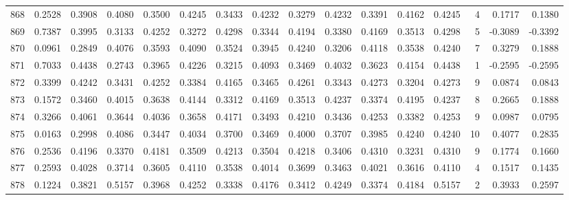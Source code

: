 \begin{tabular}{lrrrrrrrrrrrrrrr}
868 &      0.2528 &  0.3908 &  0.4080 &  0.3500 &  0.4245 &  0.3433 &  0.4232 &  0.3279 &  0.4232 &  0.3391 &   0.4162 &     0.4245 &      4 &                    0.1717 &                     0.1380 \\
869 &      0.7387 &  0.3995 &  0.3133 &  0.4252 &  0.3272 &  0.4298 &  0.3344 &  0.4194 &  0.3380 &  0.4169 &   0.3513 &     0.4298 &      5 &                   -0.3089 &                    -0.3392 \\
870 &      0.0961 &  0.2849 &  0.4076 &  0.3593 &  0.4090 &  0.3524 &  0.3945 &  0.4240 &  0.3206 &  0.4118 &   0.3538 &     0.4240 &      7 &                    0.3279 &                     0.1888 \\
871 &      0.7033 &  0.4438 &  0.2743 &  0.3965 &  0.4226 &  0.3215 &  0.4093 &  0.3469 &  0.4032 &  0.3623 &   0.4154 &     0.4438 &      1 &                   -0.2595 &                    -0.2595 \\
872 &      0.3399 &  0.4242 &  0.3431 &  0.4252 &  0.3384 &  0.4165 &  0.3465 &  0.4261 &  0.3343 &  0.4273 &   0.3204 &     0.4273 &      9 &                    0.0874 &                     0.0843 \\
873 &      0.1572 &  0.3460 &  0.4015 &  0.3638 &  0.4144 &  0.3312 &  0.4169 &  0.3513 &  0.4237 &  0.3374 &   0.4195 &     0.4237 &      8 &                    0.2665 &                     0.1888 \\
874 &      0.3266 &  0.4061 &  0.3644 &  0.4036 &  0.3658 &  0.4171 &  0.3493 &  0.4210 &  0.3436 &  0.4253 &   0.3382 &     0.4253 &      9 &                    0.0987 &                     0.0795 \\
875 &      0.0163 &  0.2998 &  0.4086 &  0.3447 &  0.4034 &  0.3700 &  0.3469 &  0.4000 &  0.3707 &  0.3985 &   0.4240 &     0.4240 &     10 &                    0.4077 &                     0.2835 \\
876 &      0.2536 &  0.4196 &  0.3370 &  0.4181 &  0.3509 &  0.4213 &  0.3504 &  0.4218 &  0.3406 &  0.4310 &   0.3231 &     0.4310 &      9 &                    0.1774 &                     0.1660 \\
877 &      0.2593 &  0.4028 &  0.3714 &  0.3605 &  0.4110 &  0.3538 &  0.4014 &  0.3699 &  0.3463 &  0.4021 &   0.3616 &     0.4110 &      4 &                    0.1517 &                     0.1435 \\
878 &      0.1224 &  0.3821 &  0.5157 &  0.3968 &  0.4252 &  0.3338 &  0.4176 &  0.3412 &  0.4249 &  0.3374 &   0.4184 &     0.5157 &      2 &                    0.3933 &                     0.2597 \\

\end{tabular}
